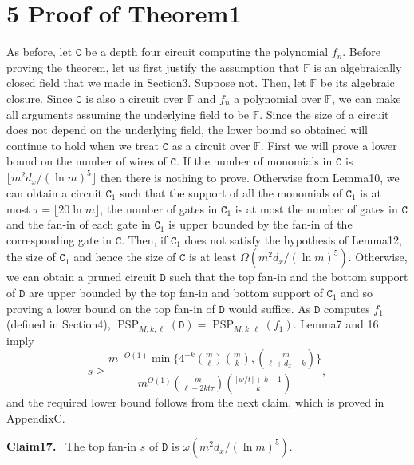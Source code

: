 \documentclass[10pt,a4paper]{article}
\newenvironment{authorclaim}[1]{\par\medskip\noindent\textbf{#1.}\ \ignorespaces}{\par\medskip}
\DeclareMathOperator{\PSP}{PSP}
\begin{document}
\section*{5 Proof of Theorem1}
As before, let $\mathtt C$ be a depth four circuit computing the polynomial $f_n$. Before proving the theorem, let us first justify the assumption that $\mathbb F$ is an algebraically closed field that we made in Section3. Suppose not. Then, let $\overline{\mathbb F}$ be its algebraic closure. Since $\mathtt C$ is also a circuit over $\overline{\mathbb F}$ and $f_n$ a polynomial over $\overline{\mathbb F}$, we can make all arguments assuming the underlying field to be $\overline{\mathbb F}$. Since the size of a circuit does not depend on the underlying field, the lower bound so obtained will continue to hold when we treat $\mathtt C$ as a circuit over $\mathbb F$.
First we will prove a lower bound on the number of wires of $\mathtt C$. If the number of monomials in $\mathtt C$ is $\lfloor m^2d_x/(\ln m)^5\rfloor$ then there is nothing to prove. Otherwise from Lemma10, we can obtain a circuit $\mathtt C_1$ such that the support of all the monomials of $\mathtt C_1$ is at most $\tau=\lfloor20\ln m\rfloor$, the number of gates in $\mathtt C_1$ is at most the number of gates in $\mathtt C$ and the fan-in of each gate in $\mathtt C_1$ is upper bounded by the fan-in of the corresponding gate in $\mathtt C$. Then, if $\mathtt C_1$ does not satisfy the hypothesis of Lemma12, the size of $\mathtt C_1$ and hence the size of $\mathtt C$ is at least $\Omega(m^2d_x/(\ln m)^5)$. Otherwise, we can obtain a pruned circuit $\mathtt D$ such that the top fan-in and the bottom support of $\mathtt D$ are upper bounded by the top fan-in and bottom support of $\mathtt C_1$ and so proving a lower bound on the top fan-in of $\mathtt D$ would suffice.
As $\mathtt D$ computes $f_1$ (defined in Section4), $\PSP_{M,k,\ell}(\mathtt D)=\PSP_{M,k,\ell}(f_1)$. Lemma7 and 16 imply
\begin{equation}
s\ge\frac{m^{-O(1)}\min\{4^{-k}\binom m\ell\binom mk,\binom m{\ell+d_x-k}\}}
{m^{O(1)}\binom m{\ell+2kt\tau}\binom{\lceil w/t\rceil+k-1}k},\tag{1}
\end{equation}
and the required lower bound follows from the next claim, which is proved in AppendixC.
\begin{authorclaim}{Claim17}
The top fan-in $s$ of $\mathtt D$ is $\omega(m^2d_x/(\ln m)^5)$.
\end{authorclaim}
\end{document}
